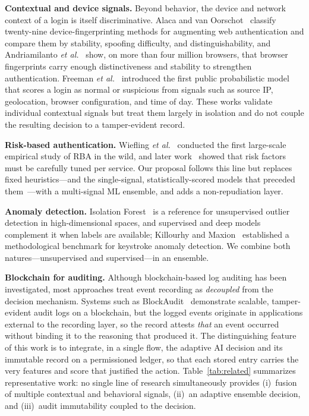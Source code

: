 \documentclass[conference]{IEEEtran}
\begin{document}
\textbf{Contextual and device signals.} Beyond behavior, the device and
network context of a login is itself discriminative. Alaca and van
Oorschot~\cite{alaca2016} classify twenty-nine device-fingerprinting
methods for augmenting web authentication and compare them by stability,
spoofing difficulty, and distinguishability, and Andriamilanto \emph{et
al.}~\cite{andriamilanto2021} show, on more than four million browsers,
that browser fingerprints carry enough distinctiveness and stability to
strengthen authentication. Freeman \emph{et al.}~\cite{freeman2016}
introduced the first public probabilistic model that scores a login as
normal or suspicious from signals such as source IP, geolocation,
browser configuration, and time of day. These works validate individual
contextual signals but treat them largely in isolation and do not couple
the resulting decision to a tamper-evident record.

\textbf{Risk-based authentication.} Wiefling \emph{et
al.}~\cite{wiefling2019} conducted the first large-scale empirical
study of RBA in the wild, and later work~\cite{wiefling2023} showed
that risk factors must be carefully tuned per service. Our proposal
follows this line but replaces fixed heuristics---and the single-signal,
statistically-scored models that preceded them~\cite{freeman2016}---with
a multi-signal ML ensemble, and adds a non-repudiation layer.

\textbf{Anomaly detection.} Isolation Forest~\cite{liu2008} is a
reference for unsupervised outlier detection in high-dimensional
spaces, and supervised and deep models~\cite{goodfellow2016} complement
it when labels are available; Killourhy and Maxion~\cite{killourhy2009}
established a methodological benchmark for keystroke anomaly detection.
We combine both natures---unsupervised and supervised---in an ensemble.

\textbf{Blockchain for auditing.} Although blockchain-based log
auditing has been investigated, most approaches treat event recording
as \emph{decoupled} from the decision mechanism. Systems such as
BlockAudit~\cite{blockaudit} demonstrate scalable, tamper-evident audit
logs on a blockchain, but the logged events originate in applications
external to the recording layer, so the record attests \emph{that} an
event occurred without binding it to the reasoning that produced it. The
distinguishing feature of this work is to integrate, in a single flow,
the adaptive AI decision and its immutable record on a permissioned
ledger, so that each stored entry carries the very features and score
that justified the action.
Table~\ref{tab:related} summarizes representative work: no single line
of research simultaneously provides (i)~fusion of multiple contextual
and behavioral signals, (ii)~an adaptive ensemble decision, and
(iii)~audit immutability coupled to the decision.
\end{document}
